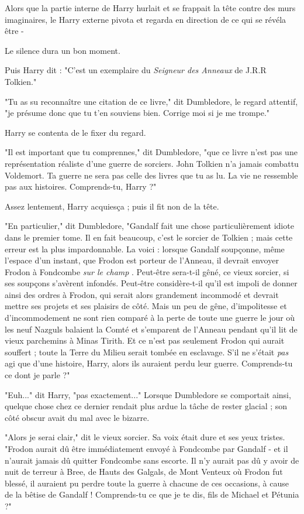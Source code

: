 Alors que la partie interne de Harry hurlait et se frappait la tête contre des murs imaginaires, le Harry externe pivota et regarda en direction de ce qui se révéla être -

Le silence dura un bon moment.

Puis Harry dit : "C'est un exemplaire du \emph{Seigneur des Anneaux}  de J.R.R Tolkien."

"Tu as su reconnaître une citation de ce livre," dit Dumbledore, le regard attentif, "je présume donc que tu t'en souviens bien. Corrige moi si je me trompe."

Harry se contenta de le fixer du regard.

"Il est important que tu comprennes," dit Dumbledore, "que ce livre n'est pas une représentation réaliste d'une guerre de sorciers. John Tolkien n'a jamais combattu Voldemort. Ta guerre ne sera pas celle des livres que tu as lu. La vie ne ressemble pas aux histoires. Comprends-tu, Harry ?"

Assez lentement, Harry acquiesça ; puis il fit non de la tête.

"En particulier," dit Dumbledore, "Gandalf fait une chose particulièrement idiote dans le premier tome. Il en fait beaucoup, c'est le sorcier de Tolkien ; mais cette erreur est la plus impardonnable. La voici : lorsque Gandalf soupçonne, même l'espace d'un instant, que Frodon est porteur de l'Anneau, il devrait envoyer Frodon à Fondcombe \emph{sur le champ} . Peut-être sera-t-il gêné, ce vieux sorcier, si ses soupçons s'avèrent infondés. Peut-être considère-t-il qu'il est impoli de donner ainsi des ordres à Frodon, qui serait alors grandement incommodé et devrait mettre ses projets et ses plaisirs de côté. Mais un peu de gêne, d'impolitesse et d'incommodement ne sont rien comparé à la perte de toute une guerre le jour où les neuf Nazguls balaient la Comté et s'emparent de l'Anneau pendant qu'il lit de vieux parchemins à Minas Tirith. Et ce n'est pas seulement Frodon qui aurait souffert ; toute la Terre du Milieu serait tombée en esclavage. S'il ne s'était \emph{pas } agi que d'une histoire, Harry, alors ils auraient perdu leur guerre. Comprends-tu ce dont je parle ?"

"Euh..." dit Harry, "pas exactement..." Lorsque Dumbledore se comportait ainsi, quelque chose chez ce dernier rendait plus ardue la tâche de rester glacial ; son côté obscur avait du mal avec le bizarre.

"Alors je serai clair," dit le vieux sorcier. Sa voix était dure et ses yeux tristes. "Frodon aurait dû être immédiatement envoyé à Fondcombe par Gandalf - et il n'aurait jamais dû quitter Fondcombe sans escorte. Il n'y aurait pas dû y avoir de nuit de terreur à Bree, de Hauts des Galgals, de Mont Venteux où Frodon fut blessé, il auraient pu perdre toute la guerre à chacune de ces occasions, à cause de la bêtise de Gandalf ! Comprends-tu ce que je te dis, fils de Michael et Pétunia ?"

